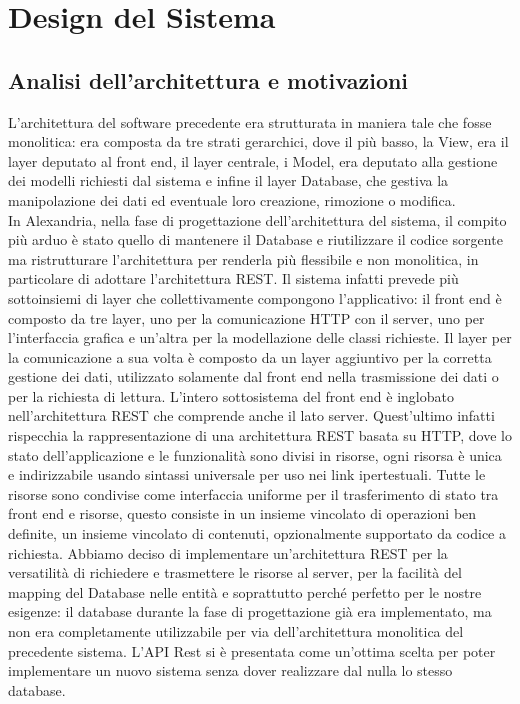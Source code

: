 \chapter{Design del Sistema}
\raggedright{\section{Analisi dell'architettura e motivazioni}}
L'architettura del software precedente era strutturata in maniera tale che fosse monolitica: era composta da tre strati gerarchici, dove il più basso, la View, era il \gls{layer} deputato al \gls{front end}, il layer centrale, i Model, era deputato alla gestione dei modelli richiesti dal sistema e infine il layer Database, che gestiva la manipolazione dei dati ed eventuale loro creazione, rimozione o modifica. \\
In Alexandria, nella fase di progettazione dell'architettura del sistema, il compito più arduo è stato quello di mantenere il Database e riutilizzare il codice sorgente ma ristrutturare l'architettura per renderla più flessibile e non monolitica, in particolare di adottare l'architettura \gls{REST}. Il sistema infatti prevede più sottoinsiemi di layer che collettivamente compongono l'applicativo: il front end è composto da tre layer, uno per la comunicazione \gls{HTTP} con il server, uno per l'interfaccia grafica e un'altra per la modellazione delle classi richieste. Il layer per la comunicazione a sua volta è composto da un layer aggiuntivo per la corretta gestione dei dati, utilizzato solamente dal front end nella trasmissione dei dati o per la richiesta di lettura. L'intero sottosistema del front end è inglobato nell'architettura \gls{REST} che comprende anche il lato server. Quest'ultimo infatti rispecchia la rappresentazione di una architettura REST basata su HTTP, dove lo stato dell'applicazione e le funzionalità sono divisi in risorse, ogni risorsa è unica e indirizzabile usando sintassi universale per uso nei link ipertestuali. Tutte le risorse sono condivise come interfaccia uniforme per il trasferimento di stato tra front end e risorse, questo consiste in un insieme vincolato di operazioni ben definite, un insieme vincolato di contenuti, opzionalmente supportato da codice a richiesta.
Abbiamo deciso di implementare un'architettura REST per la versatilità di richiedere e trasmettere le risorse al server, per la facilità del mapping del Database nelle entità e soprattutto perché perfetto per le nostre esigenze: il database durante la fase di progettazione già era implementato, ma non era completamente utilizzabile per via dell'architettura monolitica del precedente sistema. L'API Rest si è presentata come un'ottima scelta per poter implementare un nuovo sistema senza dover realizzare dal nulla lo stesso database.

